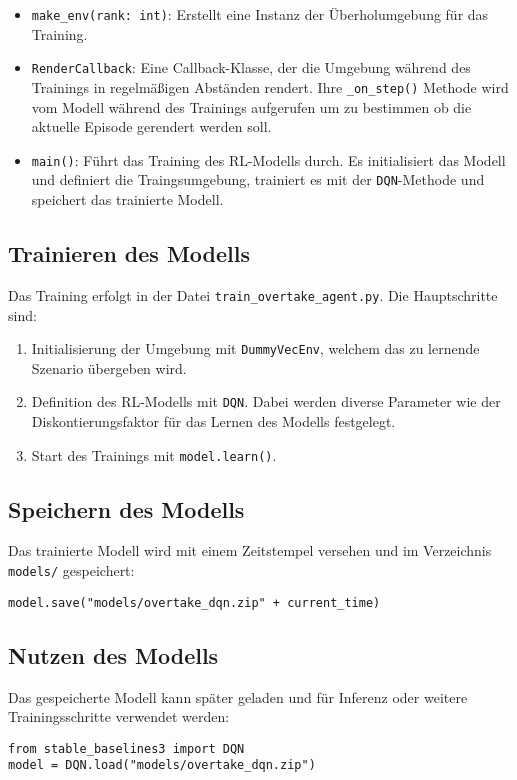 \begin{itemize}
    \item \texttt{make\_env(rank: int)}: Erstellt eine Instanz der Überholumgebung für das Training.
    \item \texttt{RenderCallback}: Eine Callback-Klasse, der die Umgebung während des Trainings in regelmäßigen Abständen rendert. Ihre \texttt{\_on\_step()} Methode wird vom Modell während des Trainings aufgerufen um zu bestimmen ob die aktuelle Episode gerendert werden soll.
    \item \texttt{main()}: Führt das Training des RL-Modells durch. Es initialisiert das Modell und definiert die Traingsumgebung, trainiert es mit der \texttt{DQN}-Methode und speichert das trainierte Modell.
\end{itemize}

\subsection{Trainieren des Modells}
Das Training erfolgt in der Datei \texttt{train\_overtake\_agent.py}. Die Hauptschritte sind:
\begin{enumerate}
    \item Initialisierung der Umgebung mit \texttt{DummyVecEnv}, welchem das zu lernende Szenario übergeben wird.
    \item Definition des RL-Modells mit \texttt{DQN}. Dabei werden diverse Parameter wie der Diskontierungsfaktor für das Lernen des Modells festgelegt.
    \item Start des Trainings mit \texttt{model.learn()}.
\end{enumerate}

\subsection{Speichern des Modells}
Das trainierte Modell wird mit einem Zeitstempel versehen und im Verzeichnis \texttt{models/} gespeichert:
\begin{lstlisting}
model.save("models/overtake_dqn.zip" + current_time)
\end{lstlisting}

\subsection{Nutzen des Modells}
Das gespeicherte Modell kann später geladen und für Inferenz oder weitere Trainingsschritte verwendet werden:
\begin{lstlisting}
from stable_baselines3 import DQN
model = DQN.load("models/overtake_dqn.zip")
\end{lstlisting}